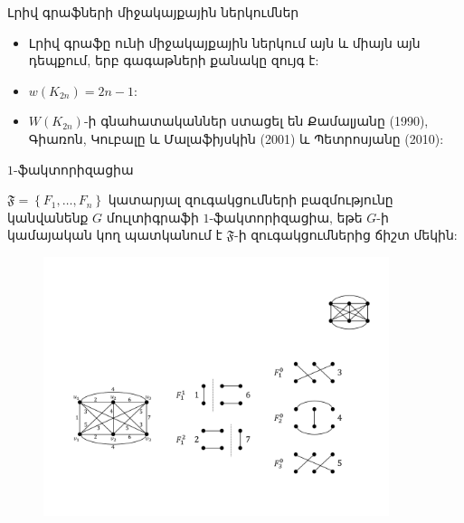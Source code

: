 \begin{frame}{Լրիվ գրաֆների միջակայքային ներկումներ}
\begin{itemize}
    \item Լրիվ գրաֆը ունի միջակայքային ներկում այն և միայն այն դեպքում, երբ գագաթների քանակը զույգ է:
    \item $w(K_{2n})=2n-1$:
    \item $W(K_{2n})$-ի գնահատականներ ստացել են Քամալյանը (1990), Գիառոն, Կուբալը և Մալաֆիյսկին (2001) և Պետրոսյանը (2010):
\end{itemize}

\end{frame}


\begin{frame}[shrink]{$1$-ֆակտորիզացիա}

$\mathfrak{F} = \left\{F_1,\ldots,F_n \right\}$ կատարյալ զուգակցումների բազմությունը կանվանենք $G$ մուլտիգրաֆի $1$-ֆակտորիզացիա, եթե $G$-ի կամայական կող պատկանում է $\mathfrak{F}$-ի զուգակցումներից ճիշտ մեկին:

\begin{figure}[t!]
\centering
\includegraphics[width=0.9\textwidth]{figures/K_6factorization.pdf}
\label{K_6factorization}
\end{figure}
\end{frame}


